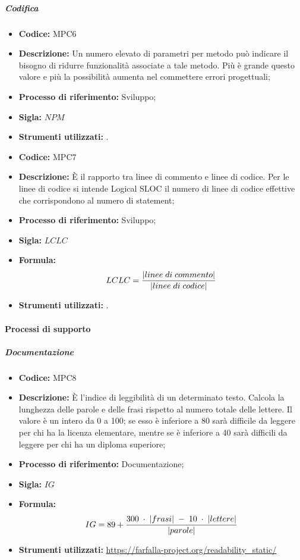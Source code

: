 \subparagraph{Codifica}
    \begin{itemize}
        \item \textbf{Codice:} MPC6
        \item \textbf{Descrizione:} Un numero elevato di parametri per metodo può indicare il bisogno di ridurre funzionalità associate a tale metodo. Più è grande questo valore e più la possibilità aumenta nel commettere errori progettuali;
        \item \textbf{Processo di riferimento:} Sviluppo;
        \item \textbf{Sigla:} $NPM$
        \item \textbf{Strumenti utilizzati:} .
    \end{itemize}

    \begin{itemize}
        \item \textbf{Codice:} MPC7
        \item \textbf{Descrizione:} È il rapporto tra linee di commento e linee di codice. Per le linee di codice si intende Logical SLOC il numero di linee di codice effettive che corrispondono al numero di statement;
        \item \textbf{Processo di riferimento:} Sviluppo;
        \item \textbf{Sigla:} $LCLC$
        \item \textbf{Formula:}$$LCLC = {|linee \; di \; commento| \over |linee \; di \; codice|}$$
        \item \textbf{Strumenti utilizzati:} .
    \end{itemize}
\paragraph{Processi di supporto}
\subparagraph{Documentazione}
\begin{itemize}
	\item \textbf{Codice:} MPC8
	\item \textbf{Descrizione:} È l'indice di leggibilità di un determinato testo. Calcola la lunghezza delle parole e delle frasi rispetto al numero totale delle lettere. Il valore è un intero da 0 a 100; se esso è inferiore a 80 sarà difficile da leggere per chi ha la licenza elementare, mentre se è inferiore a 40 sarà difficili da leggere per chi ha un diploma superiore;
	\item \textbf{Processo di riferimento:} Documentazione;
	\item \textbf{Sigla:} $IG$
	\item \textbf{Formula:} $$IG = 89 + {{300 \; \cdot \; |frasi| \; - \; 10 \; \cdot \; |lettere|}\over |parole|}$$
	\item \textbf{Strumenti utilizzati:} \url{https://farfalla-project.org/readability_static/}
\end{itemize}

